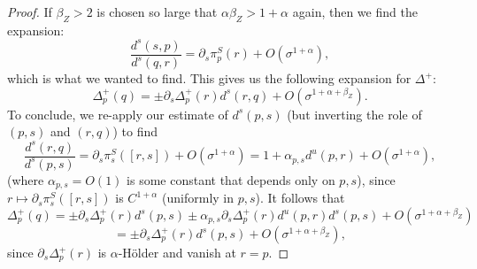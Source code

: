 \documentclass[a4paper]{article}
\theoremstyle{definition}
\begin{document}
\begin{proof}
If $\beta_Z>2$ is chosen so large that $\alpha \beta_Z > 1+\alpha$ again, then we find the expansion:
$$ \frac{d^s(s,p)}{d^s(q,r)} = \partial_s \pi_p^S(r) + O(\sigma^{1+\alpha}),$$
which is what we wanted to find. This gives us the following expansion for $\Delta^+$:
$$ \Delta_p^+(q) = \pm \partial_s \Delta_p^+(r) d^s(r,q) + O(\sigma^{1+\alpha + \beta_Z}). $$
To conclude, we re-apply our estimate of $d^s(p,s)$ (but inverting the role of $(p,s)$ and $(r,q)$) to find
$$ \frac{d^s(r,q)}{d^s(p,s)} = \partial_s \pi_{s}^S([r,s]) + O(\sigma^{1+\alpha}) = 1 + \alpha_{p,s} d^u(p,r) + O(\sigma^{1+\alpha}) ,$$
(where $\alpha_{p,s}=O(1)$ is some constant that depends only on $p,s$), since $r \mapsto \partial_s \pi_{s}^S([r,s])$ is $C^{1+\alpha}$ (uniformly in $p,s$). It follows that
$$ \Delta_p^+(q) = \pm \partial_s \Delta_p^+(r) d^s(p,s) \pm \alpha_{p,s} \partial_s \Delta_p^+(r) d^u(p,r) d^s(p,s)  + O(\sigma^{1+\alpha+\beta_Z}) $$ $$= \pm \partial_s \Delta_p^+(r) d^s(p,s) +  O(\sigma^{1+\alpha+\beta_Z}) ,$$
since $\partial_s \Delta_p^+(r)$ is $\alpha$-Hölder and vanish at $r=p$. \end{proof}
\end{document}
